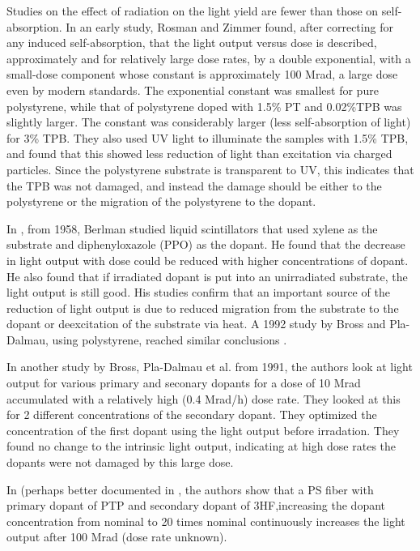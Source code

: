 Studies on the effect of radiation on the light yield are fewer
than those on self-absorption.
In an early study, Rosman and Zimmer found, after correcting
for any induced self-absorption, that the light
output versus dose is described,
approximately and for relatively large dose rates, by a double exponential, 
with a small-dose component whose constant is approximately 100 Mrad,
a large dose even by modern standards.
The exponential constant was smallest for pure polystyrene, while
that of polystyrene doped with 1.5\% PT  and 0.02\%TPB
was slightly larger.  The constant was considerably larger (less
self-absorption of light) for 3\% TPB.  They also used UV light to illuminate
the samples with 1.5\% TPB, and found that this showed less
reduction of light than excitation via charged particles.
Since the polystyrene substrate is transparent to UV, this
indicates that the TPB was not damaged, and instead the damage
should be either to the polystyrene or the migration of the polystyrene
to the dopant.

In \cite{berlman}, from 1958, Berlman studied liquid scintillators
that used xylene as the substrate and diphenyloxazole (PPO) as the dopant.
He found that the decrease in light output with dose could be
reduced with higher concentrations of dopant.  He also found
that if irradiated dopant is put into an unirradiated substrate,
the light output is still good.  His studies
confirm that
an important source of the reduction of light output is due to
reduced migration from the substrate 
to the dopant or deexcitation of the substrate via heat.
A 1992 study by Bross and Pla-Dalmau, using polystyrene,
reached similar conclusions \cite{173178}.

In another study by Bross, Pla-Dalmau et al. from 1991\cite{Bross199135}, the authors look at light output for various primary and seconary dopants for a dose of 10 Mrad accumulated with a relatively high (0.4 Mrad/h) dose rate.  They looked at this for 2 different concentrations of the secondary dopant.  They optimized the concentration of the first dopant using the light output before irradation.  They found no change to the intrinsic light output, indicating at high dose rates the dopants were
not damaged by this large dose.  

In \cite{zorn3} (perhaps better documented in \cite{sauli}, the authors show that a PS fiber with primary dopant of PTP and secondary dopant of 3HF,increasing the dopant concentration from nominal to 20 times nominal continuously increases the light output after 100 Mrad (dose rate unknown).

